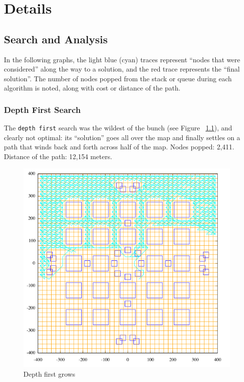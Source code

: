 \chapter{Details}\label{chap:details}
\section{Search and Analysis}\label{sec:search}
In the following graphs, the light blue (cyan) traces represent ``nodes that were considered'' along the way to a solution, and the red trace represents the ``final solution''.  The number of nodes popped from the stack or queue during each algorithm is noted, along with cost or distance of the path.

\subsection{Depth First Search}
The \texttt{depth first} search was the wildest of the bunch (see Figure ~\ref{fig:df}), and clearly not optimal: its ``solution'' goes all over the map and finally settles on a path that winds back and forth across half of the map.  Nodes popped: 2,411.  Distance of the path: 12,154 meters.

\begin{figure}\label{fig:df}
\begin{center}\centering
\includegraphics[width=\textwidth]{df1.png}
\caption{Depth first grows}
\end{center}
\end{figure}

